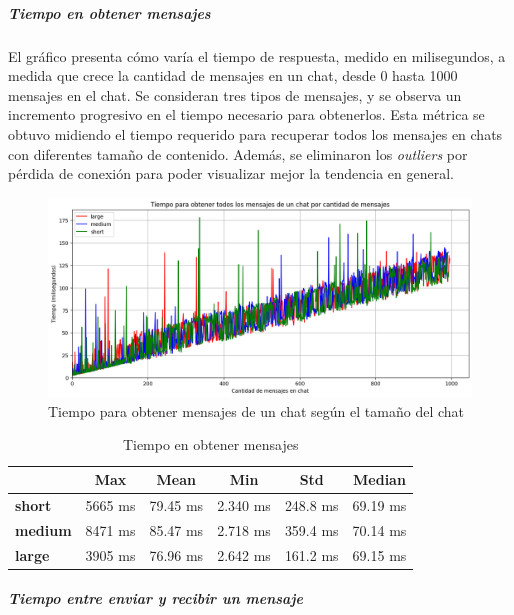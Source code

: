 \subparagraph{Tiempo en obtener mensajes}

El gráfico presenta cómo varía el tiempo de respuesta, medido en milisegundos, a medida que crece la cantidad de mensajes en un chat, desde 0 hasta 1000 mensajes en el chat. Se consideran tres tipos de mensajes, y se observa un incremento progresivo en el tiempo necesario para obtenerlos. Esta métrica se obtuvo midiendo el tiempo requerido para recuperar todos los mensajes en chats con diferentes tamaño de contenido. Además, se eliminaron los \textit{outliers} por pérdida de conexión para poder visualizar mejor la tendencia en general.

\begin{figure}[h!]
    \centering
    \includegraphics[width=1\linewidth]{img/metricas-ipfs/tiempo-para-obtener-por-cant-msjs.png}
    \caption{Tiempo para obtener mensajes de un chat según el tamaño del chat}
    \label{fig:ipfs-get-message-graphic.png}
\end{figure}

\setlength\tabcolsep{10pt}
\begin{table}[!htbp]
    \centering
    \begin{tabular}{|l|c|c|c|c|c|}
        \hline
        & \textbf{Max} & \textbf{Mean} & \textbf{Min} & \textbf{Std} & \textbf{Median} \\ \hline
        \textbf{short} & 5665 ms & 79.45 ms & 2.340 ms & 248.8 ms & 69.19 ms \\ \hline
        \textbf{medium} & 8471 ms & 85.47 ms & 2.718 ms & 359.4 ms & 70.14 ms \\ \hline
        \textbf{large} & 3905 ms & 76.96 ms & 2.642 ms & 161.2 ms & 69.15 ms \\ \hline
    \end{tabular}
    \caption{Tiempo en obtener mensajes}
\end{table}  

\subparagraph{Tiempo entre enviar y recibir un mensaje}

